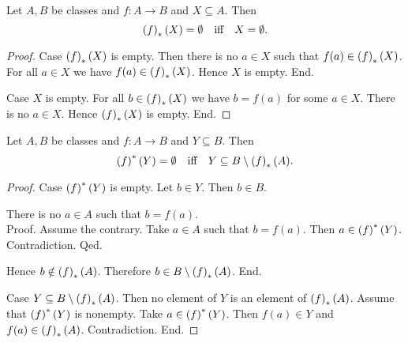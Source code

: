 \documentclass[../../set-theory/set-theory.tex]{subfiles}
\begin{document}
  \begin{forthel}
    \begin{proposition}
      Let $A, B$ be classes and $f : A \to B$ and $X \subseteq A$.
      Then \[ \left(f\right)_{*}(X) = \emptyset \quad \text{iff} \quad X = \emptyset. \]
    \end{proposition}
    \begin{proof}
      Case $\left(f\right)_{*}(X)$ is empty.
        Then there is no $a \in X$ such that $f(a) \in \left(f\right)_{*}(X)$.
        For all $a \in X$ we have $f(a) \in \left(f\right)_{*}(X)$.
        Hence $X$ is empty.
      End.

      Case $X$ is empty.
        For all $b \in \left(f\right)_{*}(X)$ we have $b = f(a)$ for some $a \in X$.
        There is no $a \in X$.
        Hence $\left(f\right)_{*}(X)$ is empty.
      End.
    \end{proof}
  \end{forthel}

  \begin{forthel}
    \begin{proposition}
      Let $A, B$ be classes and $f : A \to B$ and $Y \subseteq B$.
      Then \[ \left(f\right)^{*}(Y) = \emptyset \quad \text{iff} \quad Y \subseteq B \setminus \left(f\right)_{*}(A). \]
    \end{proposition}
    \begin{proof}
      Case $\left(f\right)^{*}(Y)$ is empty.
        Let $b \in Y$.
        Then $b \in B$.

        There is no $a \in A$ such that $b = f(a)$. \\
        Proof.
          Assume the contrary.
          Take $a \in A$ such that $b = f(a)$.
          Then $a \in \left(f\right)^{*}(Y)$.
          Contradiction.
        Qed.

        Hence $b \notin \left(f\right)_{*}(A)$.
        Therefore $b \in B \setminus \left(f\right)_{*}(A)$.
      End.

      Case $Y \subseteq B \setminus \left(f\right)_{*}(A)$.
        Then no element of $Y$ is an element of $\left(f\right)_{*}(A)$.
        Assume that $\left(f\right)^{*}(Y)$ is nonempty.
        Take $a \in \left(f\right)^{*}(Y)$.
        Then $f(a) \in Y$ and $f(a) \in \left(f\right)_{*}(A)$.
        Contradiction.
      End.
    \end{proof}
  \end{forthel}
\end{document}
